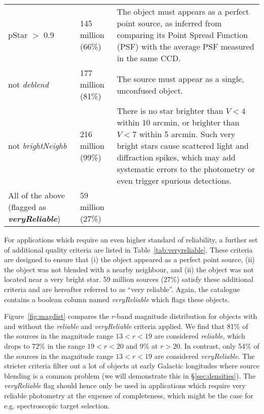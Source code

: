 \documentclass[useAMS,usenatbib]{mn2e}
\begin{document}
\begin{table*}
\begin{tabular}{p{8cm}lp{6cm}}
   pStar $>$ 0.9 &
   145 million (66\%) &
   The object must appears as a perfect point source,
   as inferred from comparing its Point Spread Function (PSF)
   with the average PSF measured in the same CCD. \\
   
   {\sc not} \emph{deblend} &
   177 million (81\%) &
   The source must appear as a single, unconfused object. \\
   
   {\sc not} \emph{brightNeighb} &
   216 million (99\%) &
   There is no star brighter than $V < 4$ within 10 arcmin, 
   or brighter than $V < 7$ within 5 arcmin.
   Such very bright stars cause scattered light and diffraction spikes,
   which may add systematic errors to the photometry
   or even trigger spurious detections. \\  
  \hline
  
  All of the above (flagged as {\bf\emph{veryReliable}}) &
  59 million (27\%) & \\
  \hline
\end{tabular}
\caption{Additional quality criteria which are recommended
for applications which require very reliable colours
at the expense of completeness. 
For convenience, the sources which satisfy the criteria listed
in this table have been flagged in the catalogue
using the column named \emph{veryReliable}.}
\label{tab:veryreliable}

\vspace{2cm}
\end{table*}

For applications which require
an even higher standard of reliability,
a further set of additional quality criteria
are listed in Table~\ref{tab:veryreliable}.
These criteria are designed to ensure that
(i) the object appeared as a perfect point source,
(ii) the object was not blended with a nearby neighbour,
and (ii) the object was not located near a very bright star.
59 million sources (27\%) satisfy
these additional criteria 
and are hereafter referred to as ``very reliable''.
Again, the catalogue contains a boolean column
named \emph{veryReliable} which flags these objects.

Figure~\ref{fig:magdist} compares the $r$-band magnitude
distribution for objects with and without the 
\emph{reliable} and \emph{veryReliable} criteria applied. 
We find that 81\% of the sources 
in the magnitude range $13 < r < 19$
are considered \emph{reliable},
which drops to 72\% in the range $19 < r < 20$
and 9\% at $r>20$.
In contrast, only 54\% of the sources 
in the magnitude range $13 < r < 19$
are considered \emph{veryReliable}.
The stricter criteria filter out a lot
of objects at early Galactic longitudes 
where source blending is a common problem
(we will demonstrate this in \S\ref{sec:densities}).
The \emph{veryReliable} flag should hence
only be used in applications which require very reliable photometry
at the expense of completeness,
which might be the case for e.g. spectroscopic target selection.
\end{document}
